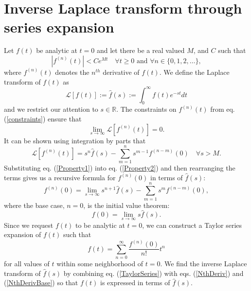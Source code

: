 \documentclass[extra,mreferee]{gji}
\begin{document}
\section{Inverse Laplace transform through series expansion}
Let $f(t)$ be analytic at $t=0$ and let there
  be a real valued $M$, and $C$ such that
\begin{equation}\label{constraints}
  \left|f^{(n)}(t)\right| < Ce^{Mt}\quad \forall t\geq 0\text{ and }\forall n\in\{0,1,2,\dots\},
\end{equation}
where $f^{(n)}(t)$ denotes the $n^{th}$ derivative of $f(t)$.  We
define the Laplace transform of $f(t)$ as
\begin{equation}
  \mathcal{L}[f(t)] := \hat{f}(s) := \int_{0}^\infty f(t)e^{-st}dt
\end{equation}
and we restrict our attention to $s\in\mathbb{R}$.  The constraints on
$f^{(n)}(t)$ from eq. (\ref{constraints}) ensure that
\begin{equation}\label{Property2}
  \lim_{s \to \infty}\mathcal{L}[f^{(n)}(t)] = 0.
\end{equation}
It can be shown using integration by parts that
\begin{equation}\label{Property1}
  \mathcal{L}[f^{(n)}(t)] = s^n\hat{f}(s) - \sum_{m=1}^ns^{m-1}f^{(n-m)}(0)
  \quad \forall s>M.
\end{equation}
Substituting eq. (\ref{Property1}) into eq. (\ref{Property2}) and then
rearranging the terms gives us a recursive formula for $f^{(n)}(0)$ in
terms of $\hat{f}(s)$:
\begin{equation}\label{NthDeriv}
  f^{(n)}(0) = \lim_{s \to \infty} s^{n + 1}\hat{f}(s) -
               \sum_{m=1}^{n} s^{m}f^{(n-m)}(0),
\end{equation}
where the base case, $n=0$, is the initial value theorem:
\begin{equation}\label{NthDerivBase}
  f(0) = \lim_{s \to \infty} s\hat{f}(s).
\end{equation}
Since we request $f(t)$ to be analytic at $t=0$, we can construct a
Taylor series expansion of $f(t)$ such that
\begin{equation}\label{TaylorSeries}
  f(t) = \sum_{n=0}^\infty\frac{f^{(n)}(0)}{n!}t^n
\end{equation}
for all values of $t$ within some neighborhood of $t=0$. We find the
inverse Laplace transform of $\hat{f}(s)$ by combining
eq. (\ref{TaylorSeries}) with eqs. (\ref{NthDeriv}) and
(\ref{NthDerivBase}) so that $f(t)$ is expressed in terms of
$\hat{f}(s)$.
\end{document}
